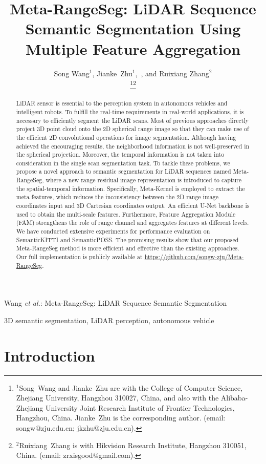 \documentclass[letterpaper, 10 pt, journal, twoside]{ieeetran}
\title{Meta-RangeSeg: LiDAR Sequence Semantic Segmentation Using Multiple Feature Aggregation}
\author{
Song Wang$^{1}$, Jianke~Zhu$^{1}$,~\IEEEmembership{Senior~Member,~IEEE}, and Ruixiang Zhang$^{2}$


\thanks{$^{1}$Song~Wang and Jianke~Zhu are with the College of Computer Science, Zhejiang University, Hangzhou 310027, China, and also with the Alibaba-Zhejiang University
Joint Research Institute of Frontier Technologies, Hangzhou, China. Jianke~Zhu is the corresponding author. (email: songw@zju.edu.cn; jkzhu@zju.edu.cn). }\thanks{$^{2}$Ruixiang~Zhang is with Hikvision Research Institute, Hangzhou 310051, China. (email: zrxisgood@gmail.com).}


}
\begin{document}
\maketitle

{Wang \MakeLowercase{\textit{et al.}}: Meta-RangeSeg: LiDAR Sequence Semantic Segmentation}

\begin{abstract}
LiDAR sensor is essential to the perception system in autonomous vehicles and intelligent robots. To fulfill the real-time requirements in real-world applications, it is necessary to efficiently segment the LiDAR scans. Most of previous approaches directly project 3D point cloud onto the 2D spherical range image so that they can make use of the efficient 2D convolutional operations for image segmentation. Although having achieved the encouraging results, the neighborhood information is not well-preserved in the spherical projection. Moreover, the temporal information is not taken into consideration in the single scan segmentation task. To tackle these problems, we propose a novel approach to semantic segmentation for LiDAR sequences named Meta-RangeSeg, where a new range residual image representation is introduced to capture the spatial-temporal information. Specifically, Meta-Kernel is employed to extract the meta features, which reduces the inconsistency between the 2D range image coordinates input and 3D Cartesian coordinates output. An efficient U-Net backbone is used to obtain the multi-scale features. Furthermore, Feature Aggregation Module (FAM) strengthens the role of range channel and aggregates features at different levels. We have conducted extensive experiments for performance evaluation on SemanticKITTI and SemanticPOSS. The promising results show that our proposed Meta-RangeSeg method is more efficient and effective than the existing approaches. Our full implementation is publicly available at \url{https://github.com/songw-zju/Meta-RangeSeg}.
\end{abstract}

\begin{IEEEkeywords}
3D semantic segmentation, LiDAR perception, autonomous vehicle
\end{IEEEkeywords}

\section{Introduction}
\label{sec:intro}
\end{document}
